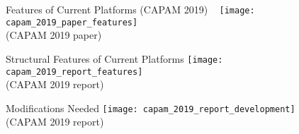 \documentclass[aspectratio=169,fleqn]{beamer}
\begin{document}
\begin{frame}{Features of Current Platforms (CAPAM 2019)}\fns
  ~\hspace{-4ex}%
  \texttt{[image: capam\_2019\_paper\_features]}\\[1ex]
  \gray\scriptsize (CAPAM 2019 paper)
\end{frame}


\begin{frame}{Structural Features of Current Platforms}\fns
  \texttt{[image: capam\_2019\_report\_features]}\\[2ex]
  \gray\scriptsize (CAPAM 2019 report)
\end{frame}


\begin{frame}{Modifications Needed}\fns
  \vspace{4ex}
  \texttt{[image: capam\_2019\_report\_development]}\\[5ex]
  \gray\scriptsize (CAPAM 2019 report)
\end{frame}

\end{document}
